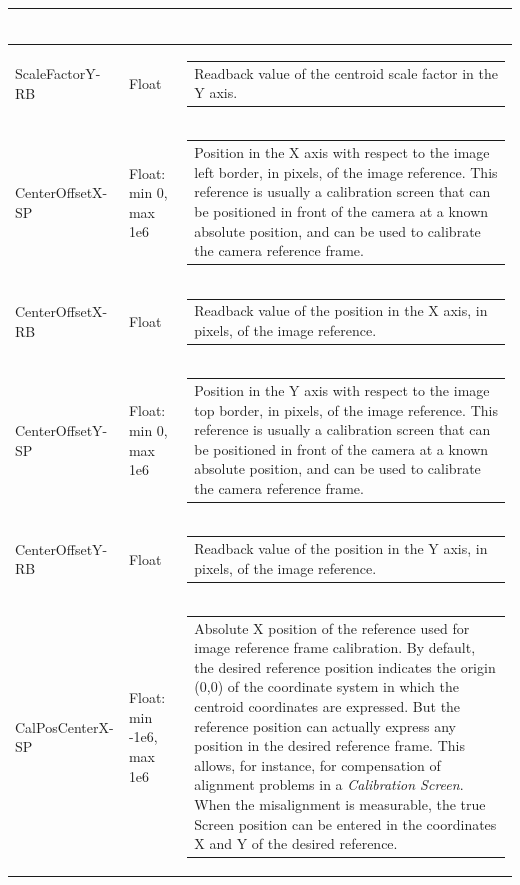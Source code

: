 \documentclass[openany]{article}
\begin{document}
\begin{longtable}{| m{3.0cm} m{4.5cm}  m{7.0cm} |}
\begin{tabular}{@{}m{6cm}@{}}
            \end{tabular} \\ \hline
        ScaleFactorY-RB & Float & \begin{tabular}{@{}m{6cm}@{}}
                Readback value of the centroid scale factor in the Y axis.
            \end{tabular} \hypertarget{pv:center-offset-x}{}\\ \hline
        CenterOffsetX-SP & Float: min 0, max 1e6 & \begin{tabular}{@{}m{6cm}@{}}
                Position in the X axis with respect to the image left border, in pixels, of the image reference. This reference is usually a calibration screen that can be positioned in front of the camera at a known absolute position, and can be used to calibrate the camera reference frame.
            \end{tabular} \\ \hline
        CenterOffsetX-RB & Float & \begin{tabular}{@{}m{6cm}@{}}
                Readback value of the position in the X axis, in pixels, of the image reference.
            \end{tabular} \hypertarget{pv:center-offset-y}{}\\ \hline
        CenterOffsetY-SP & Float: min 0, max 1e6 & \begin{tabular}{@{}m{6cm}@{}}
                Position in the Y axis with respect to the image top border, in pixels, of the image reference. This reference is usually a calibration screen that can be positioned in front of the camera at a known absolute position, and can be used to calibrate the camera reference frame.
            \end{tabular} \\ \hline
        CenterOffsetY-RB & Float & \begin{tabular}{@{}m{6cm}@{}}
                Readback value of the position in the Y axis, in pixels, of the image reference.
            \end{tabular} \hypertarget{pv:cal-pos-center-x}{}\\ \hline
        CalPosCenterX-SP & Float: min -1e6, max 1e6 & \begin{tabular}{@{}m{6cm}@{}}
                Absolute X position of the reference used for image reference frame calibration. By default, the desired reference position indicates the origin (0,0) of the coordinate system in which the centroid coordinates are expressed. But the reference position can actually express any position in the desired reference frame. This allows, for instance, for compensation of alignment problems in a \emph{Calibration Screen}. When the misalignment is measurable, the true Screen position can be entered in the coordinates X and Y of the desired reference.

\end{tabular}
\end{longtable}
\end{document}
